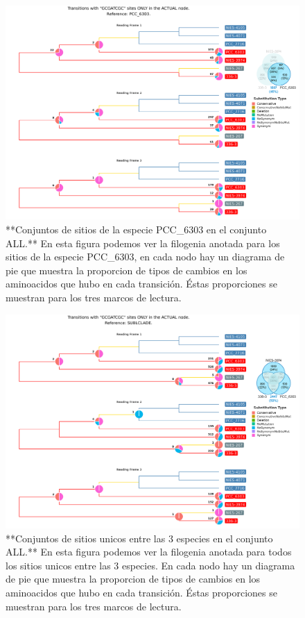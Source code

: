 \documentclass[
]{book}
\begin{document}
\begin{figure}

{\centering \includegraphics[width=1.2\linewidth]{Clados/Calothrix_B/figures/A/GCGATCGC/Actual/PCC_6303_Actual_A_tree} 

}

\caption{**Conjuntos de sitios de la especie PCC\_6303 en el conjunto ALL.** En esta figura podemos ver la filogenia anotada para los sitios de la especie PCC\_6303, en cada nodo hay un diagrama de pie que muestra la proporcion de tipos de cambios en los aminoacidos que hubo en cada transición. Éstas proporciones se muestran para los tres marcos de lectura.}\label{fig:FIG15}
\end{figure}

\begin{figure}

{\centering \includegraphics[width=1.2\linewidth]{Clados/Calothrix_B/figures/A/GCGATCGC/Actual/SUBCLADE_Actual_A_tree} 

}

\caption{**Conjuntos de sitios unicos entre las 3 especies en el conjunto ALL.** En esta figura podemos ver la filogenia anotada para todos los sitios unicos entre las 3 especies. En cada nodo hay un diagrama de pie que muestra la proporcion de tipos de cambios en los aminoacidos que hubo en cada transición. Éstas proporciones se muestran para los tres marcos de lectura.}\label{fig:FIG16}
\end{figure}
\end{document}
